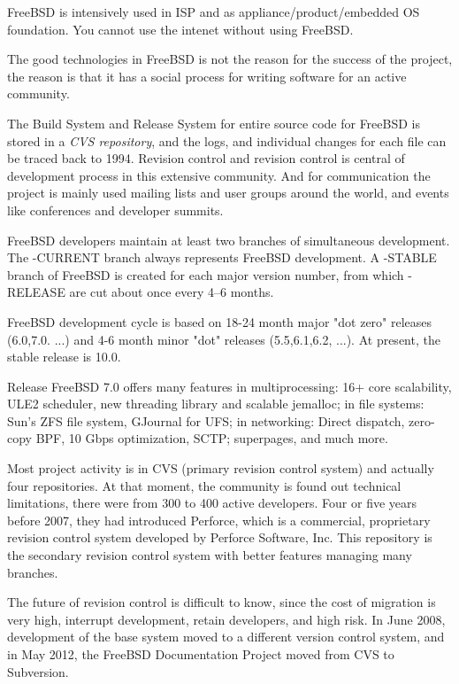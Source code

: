 \documentclass[11pt]{article}
\begin{document}
FreeBSD is intensively used in ISP and as appliance/product/embedded OS foundation. You cannot use the intenet without using FreeBSD.

The good technologies in FreeBSD is not the reason for the success of the project, the reason is that it has a social process for writing software for an active community. 

The Build System and Release System for entire source code for FreeBSD is stored in a \emph{CVS repository}, and the logs, and individual changes for each file can be traced back to 1994. Revision control and revision control is central of development process in this extensive community. And for communication the project is mainly used mailing lists and user groups around the world, and events like conferences and developer summits.

FreeBSD developers maintain at least two branches of simultaneous development. The -CURRENT branch always represents FreeBSD development. A -STABLE branch of FreeBSD is created for each major version number, from which -RELEASE are cut about once every 4–6 months. 

FreeBSD development cycle is based on 18-24 month major "dot zero" releases (6.0,7.0. ...) and 4-6 month minor "dot" releases (5.5,6.1,6.2, ...). At present, the stable release is 10.0.

Release FreeBSD 7.0 offers many features in multiprocessing: 16+ core scalability, ULE2 scheduler, new threading library and scalable jemalloc; in file systems: Sun's ZFS file system, GJournal for UFS; in networking: Direct dispatch, zero-copy BPF, 10 Gbps optimization, SCTP; superpages, and much more.

Most project activity is in CVS (primary revision control system) and actually four repositories. At that moment, the community is found out technical limitations, there were from 300 to 400 active developers. Four or five years before 2007, they had introduced Perforce, which  is a commercial, proprietary revision control system developed by Perforce Software, Inc. This repository is the secondary revision control system with better features managing many branches.

The future of revision control is difficult to know, since the cost of migration is very high, interrupt development, retain developers, and high risk. In June 2008, development of the base system moved to a different version control system, and in May 2012, the FreeBSD Documentation Project moved from CVS to Subversion. 
\end{document}
